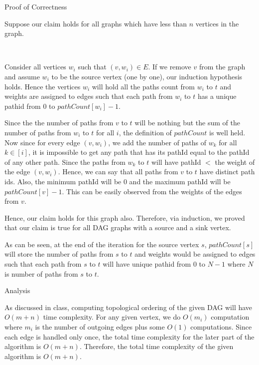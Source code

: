 \documentclass{article}
\begin{document}
\begin{question}
\begin{qsection}{Proof of Correctness}
\begin{qproof}
			 Suppose our claim holds for all graphs which have less than $n$ vertices in the graph.

			 \sbr\

			Consider all vertices $w_i$ such that $(v, w_i) \in E$. If we remove $v$ from the graph and assume $w_i$ to be the source vertex (one by one), our induction hypothesis holds. Hence the vertices $w_i$ will hold all the paths count from $w_i$ to $t$ and weights are assigned to edges such that each path from $w_i$ to $t$ has a unique pathid from 0 to $pathCount[w_i]-1$. \br\

			Since the the number of paths from $v$ to $t$ will be nothing but the sum of the number of paths from $w_i$ to $t$ for all $i$, the definition of $pathCount$ is well held. Now since for every edge $(v, w_i)$, we add the number of paths of $w_k$ for all $k \in [i]$, it is impossible to get any path that has its pathId equal to the pathId of any other path. Since the paths from $w_k$ to $t$ will have pathId $<$ the weight of the edge $(v, w_i)$. Hence, we can say that all paths from $v$ to $t$ have distinct path ids. Also, the minimum pathId will be 0 and the maximum pathId will be $pathCount[v] - 1$. This can be easily observed from the weights of the edges from $v$. \br\
			
			Hence, our claim holds for this graph also. Therefore, via induction, we proved that our claim is true for all DAG graphs with a source and a sink vertex.

		\end{qproof}
		
		As can be seen, at the end of the iteration for the source vertex $s$, $pathCount[s]$ will store the number of paths from $s$ to $t$ and weights would be assigned to edges such that each path from $s$ to $t$ will have unique pathid from $0$ to $N-1$ where $N$ is number of paths from $s$ to $t$.

	\end{qsection}

	\begin{qsection}{Analysis}

		As discussed in class, computing topological ordering of the given DAG will have $O(m + n)$ time complexity. For any given vertex, we do $O(m_i)$ computation where $m_i$ is the number of outgoing edges plus some $O(1)$ computations. Since each edge is handled only once, the total time complexity for the later part of the algorithm is $O(m + n)$. Therefore, the total time complexity of the given algorithm is $O(m + n)$.

	\end{qsection}

\end{question}
\end{document}
